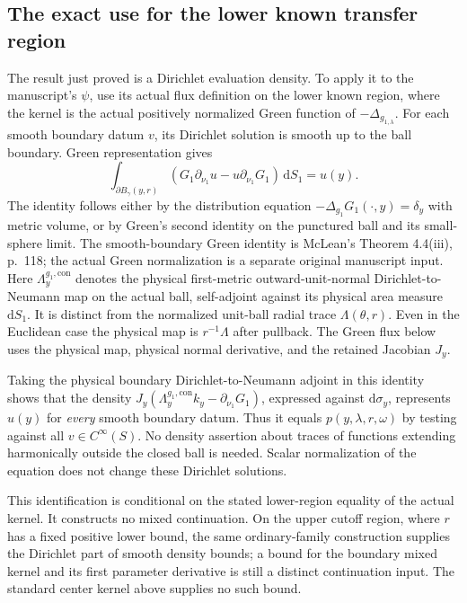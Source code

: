\documentclass[11pt]{article}
\theoremstyle{definition}
\theoremstyle{remark}
\newcommand{\dd}{\mathrm d}
\numberwithin{equation}{section}
\providecommand{\la}{\lambda}
\providecommand{\tht}{\theta}
\begin{document}
\subsection*{The exact use for the lower known transfer region}

The result just proved is a Dirichlet evaluation density. To apply it to
the manuscript's $\psi$, use its actual flux definition on the lower known
region, where the kernel is the actual positively normalized Green function
of $-\Delta_{g_{1,\la}}$. For each smooth boundary datum $v$, its Dirichlet
solution is smooth up to the ball boundary. Green representation gives
\[
 \int_{\partial B_\gamma(y,r)}
       (G_1\partial_{\nu_1}u-u\partial_{\nu_1}G_1)\,\dd S_1=u(y).
\]
The identity follows either by the distribution equation
$-\Delta_{g_1}G_1(\cdot,y)=\delta_y$ with metric volume, or by Green's
second identity on the punctured ball and its small-sphere limit. The
smooth-boundary Green identity is McLean's Theorem 4.4(iii), p.~118;
the actual Green normalization is a separate original manuscript input.
Here $\Lambda_y^{g_1,\mathrm{con}}$ denotes the physical first-metric
outward-unit-normal Dirichlet-to-Neumann map on the actual ball,
self-adjoint against its physical area measure $\dd S_1$. It is distinct
from the normalized unit-ball radial trace $\Lambda(\tht,r)$.
Even in the Euclidean case the physical map is $r^{-1}\Lambda$ after
pullback. The Green flux below uses the physical map, physical normal
derivative, and the retained Jacobian $J_y$.

Taking the physical boundary Dirichlet-to-Neumann adjoint in this identity
shows that the density
$J_y(\Lambda_y^{g_1,\mathrm{con}}k_y-\partial_{\nu_1}G_1)$, expressed against $\dd\sigma_y$,
represents $u(y)$ for \emph{every} smooth boundary datum. Thus it equals
$p(y,\la,r,\omega)$ by testing against all $v\in C^\infty(S)$.
No density assertion about traces of functions extending harmonically
outside the closed ball is needed. Scalar normalization of the equation
does not change these Dirichlet solutions.

This identification is conditional on the stated lower-region equality
of the actual kernel. It constructs no mixed continuation. On the upper
cutoff region, where $r$ has a fixed positive lower bound, the same
ordinary-family construction supplies the Dirichlet part of smooth
density bounds; a bound for the boundary mixed kernel and its first
parameter derivative is still a distinct continuation input. The
standard center kernel above supplies no such bound.
\end{document}
